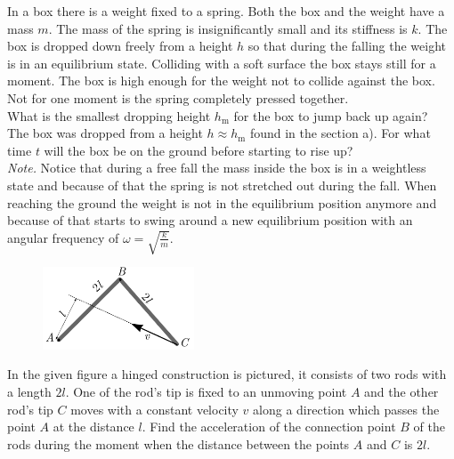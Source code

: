 \documentclass[11pt]{article}
\begin{document}
\probeng
In a box there is a weight fixed to a spring. Both the box and the weight have a mass $m$. The mass of the spring is insignificantly small and its stiffness is $k$. The box is dropped down freely from a height $h$ so that during the falling the weight is in an equilibrium state. Colliding with a soft surface the box stays still for a moment. The box is high enough for the weight not to collide against the box. Not for one moment is the spring completely pressed together.\\
\osa What is the smallest dropping height $h_\text{m}$ for the box to jump back up again?\\
\osa The box was dropped from a height $h\approx h_\text{m}$ found in the section a). For what time $t$ will the box be on the ground before starting to rise up?\\
\emph{Note.} Notice that during a free fall the mass inside the box is in a weightless state and because of that the spring is not stretched out during the fall. When reaching the ground the weight is not in the equilibrium position anymore and because of that starts to swing around a new equilibrium position with an angular frequency of $\omega =\sqrt{\frac{k}{m}}$.
\probend
\bigskip


\probeng
\begin{figure}
	\vspace{-10pt}
	\includegraphics[width = 0.4\textwidth]  {2017-lahg-10-delta.pdf}
\end{figure}
In the given figure a hinged construction is pictured, it consists of two rods with a length $2l$. One of the rod’s tip is fixed to an unmoving point $A$ and the other rod’s tip $C$ moves with a constant velocity $v$ along a direction which passes the point $A$ at the distance $l$. Find the acceleration of the connection point $B$ of the rods during the moment when the distance between the points $A$ and $C$ is $2l$.
\probend
\bigskip
\newpage\subsection{\protect{}}
\end{document}
